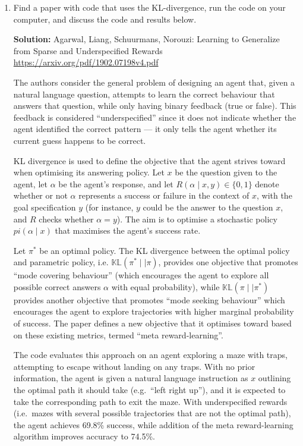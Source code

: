 \documentclass[11pt]{article}
\newenvironment{solution}{\vspace{0.16in} {\bf Solution:}}{\vspace{0.16in}}
\begin{document}
\begin{enumerate}

    \item Find a paper with code that uses the KL-divergence, run the code on
        your computer, and discuss the code and results below.

    \begin{solution}
        Agarwal, Liang, Schuurmans, Norouzi: Learning to Generalize from Sparse and Underspecified
        Rewards \url{https://arxiv.org/pdf/1902.07198v4.pdf}

        The authors consider the general problem of designing an agent that, given a natural
        language question, attempts to learn the correct behaviour that answers that question, while
        only having binary feedback (true or false). This feedback is considered ``underspecified''
        since it does not indicate whether the agent identified the correct pattern --- it only
        tells the agent whether its current guess happens to be correct.

        KL divergence is used to define the objective that the agent strives toward when optimising
        its answering policy. Let $x$ be the question given to the agent, let $\alpha$ be the
        agent's response, and let $R(\alpha \mid x, y) \in \{0, 1\}$ denote whether or not $\alpha$
        represents a success or failure in the context of $x$, with the goal specification $y$ (for
        instance, $y$ could be the answer to the question $x$, and $R$ checks whether $\alpha = y$).
        The aim is to optimise a stochastic policy $pi(\alpha \mid x)$ that maximises the agent's
        success rate.

        Let $\pi^*$ be an optimal policy. The KL divergence between the optimal policy and
        parametric policy, i.e. $\mathbb{KL}(\pi^* \mid\mid \pi)$, provides one objective that
        promotes ``mode covering behaviour'' (which encourages the agent to explore all possible
        correct answers $\alpha$ with equal probability), while $\mathbb{KL}(\pi \mid\mid \pi^*)$
        provides another objective that promotes ``mode seeking behaviour'' which encourages the
        agent to explore trajectories with higher marginal probability of success. The paper defines
        a new objective that it optimises toward based on these existing metrics, termed ``meta
        reward-learning''.

        The code evaluates this approach on an agent exploring a maze with traps, attempting to
        escape without landing on any traps. With no prior information, the agent is given a natural
        language instruction as $x$ outlining the optimal path it should take (e.g.\ ``left right
        up''), and it is expected to take the corresponding path to exit the maze. With
        underspecified rewards (i.e.\ mazes with several possible trajectories that are not the
        optimal path), the agent achieves 69.8\% success, while addition of the meta reward-learning
        algorithm improves accuracy to 74.5\%.
    \end{solution}
\end{enumerate}
\end{document}
